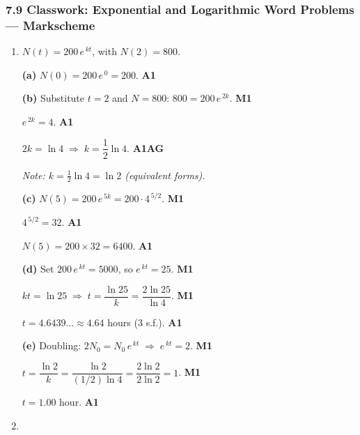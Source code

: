 \documentclass[12pt, twoside]{article}
\begin{document}
\subsubsection*{7.9 Classwork: Exponential and Logarithmic Word Problems
--- Markscheme}

\begin{enumerate}[itemsep=0.3cm]

\item[1.] [Maximum mark: 13]

$N(t) = 200\, e^{\,kt}$, with $N(2) = 800$.

\medskip

\textbf{(a)} $N(0) = 200\, e^{\,0} = 200$. \hfill \textbf{A1}

\medskip

\textbf{(b)} Substitute $t = 2$ and $N = 800$:
$800 = 200\, e^{\,2k}$. \hfill \textbf{M1}

$e^{\,2k} = 4$. \hfill \textbf{A1}

$2k = \ln 4 \;\Rightarrow\; k = \dfrac{1}{2}\ln 4$. \hfill \textbf{A1\;AG}

\emph{Note: $k = \tfrac{1}{2}\ln 4 = \ln 2$ (equivalent forms).}

\medskip

\textbf{(c)} $N(5) = 200\, e^{\,5k} = 200 \cdot 4^{\,5/2}$. \hfill \textbf{M1}

$4^{\,5/2} = 32$. \hfill \textbf{A1}

$N(5) = 200 \times 32 = 6400$. \hfill \textbf{A1}

\medskip

\textbf{(d)} Set $200\, e^{\,kt} = 5000$, so $e^{\,kt} = 25$. \hfill \textbf{M1}

$kt = \ln 25 \;\Rightarrow\; t = \dfrac{\ln 25}{k}
= \dfrac{2\ln 25}{\ln 4}$. \hfill \textbf{M1}

$t = 4.6439\ldots \approx 4.64$ hours (3 s.f.). \hfill \textbf{A1}

\medskip

\textbf{(e)} Doubling: $2 N_{0} = N_{0}\, e^{\,kt}
\;\Rightarrow\; e^{\,kt} = 2$. \hfill \textbf{M1}

$t = \dfrac{\ln 2}{k} = \dfrac{\ln 2}{(1/2)\ln 4}
= \dfrac{2\ln 2}{2\ln 2} = 1$. \hfill \textbf{M1}

$t = 1.00$ hour. \hfill \textbf{A1}

\newpage

\item[2.] [Maximum mark: 12]


\end{enumerate}
\end{document}

